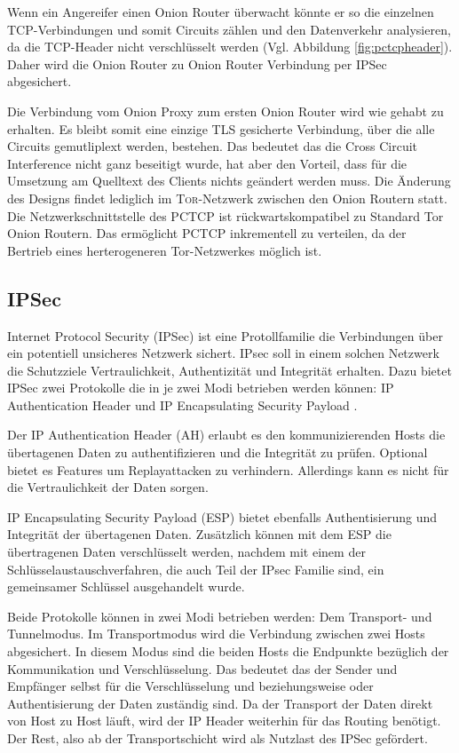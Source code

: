 \documentclass[fleqn,envcountsame,runningheads,10pt,a4paper]{llncs}
\begin{document}
Wenn ein Angereifer einen Onion Router überwacht könnte er so die einzelnen TCP-Ver\-bin\-dung\-en und somit Circuits zählen und den Datenverkehr analysieren, da die TCP-Header nicht verschlüsselt werden (Vgl. Abbildung \ref{fig:pctcpheader}). Daher wird die Onion Router zu Onion Router Verbindung per IPSec abgesichert.

Die Verbindung vom Onion Proxy zum ersten Onion Router wird wie gehabt zu erhalten. Es bleibt somit eine einzige TLS gesicherte Verbindung, über die alle Circuits gemutliplext werden, bestehen. Das bedeutet das die Cross Circuit Interference nicht ganz beseitigt wurde, hat aber den Vorteil, dass für die Umsetzung am Quelltext des Clients nichts geändert werden muss. Die Änderung des Designs findet lediglich im \textsc{Tor}-Netzwerk zwischen den Onion Routern statt. Die Netzwerkschnittstelle des PCTCP ist rückwartskompatibel zu Standard Tor Onion Routern. Das ermöglicht PCTCP inkrementell zu verteilen, da der Bertrieb eines herterogeneren Tor-Netzwerkes möglich ist.

\subsection{IPSec}

Internet Protocol Security (IPSec) ist eine Protollfamilie die Verbindungen über ein potentiell unsicheres Netzwerk sichert. IPsec soll in einem solchen Netzwerk die Schutzziele Vertraulichkeit, Authentizität und Integrität erhalten. Dazu bietet IPSec zwei Protokolle die in je zwei Modi betrieben werden können: IP Authentication Header \cite{rfc:ah} und IP Encapsulating Security Payload \cite{rfc:esp}.

Der IP Authentication Header (AH) erlaubt es den kommunizierenden Hosts die übertagenen Daten zu authentifizieren und die Integrität zu prüfen. Optional bietet es Features um Replayattacken zu verhindern. Allerdings kann es nicht für die Vertraulichkeit der Daten sorgen.

IP Encapsulating Security Payload (ESP) bietet ebenfalls Authentisierung und Integrität der übertagenen Daten. Zusätzlich können mit dem ESP die übertragenen Daten verschlüsselt werden, nachdem mit einem der Schlüsselaustauschverfahren, die auch Teil der IPsec Familie sind, ein gemeinsamer Schlüssel ausgehandelt wurde. 

Beide Protokolle können in zwei Modi betrieben werden: Dem Transport- und Tunnelmodus. Im Transportmodus wird die Verbindung zwischen zwei Hosts abgesichert. In diesem Modus sind die beiden Hosts die Endpunkte bezüglich der Kommunikation und Verschlüsselung. Das bedeutet das der Sender und Empfänger selbst für die Verschlüsselung und beziehungsweise oder Authentisierung der Daten zuständig sind. Da der Transport der Daten direkt von Host zu Host läuft, wird der IP Header weiterhin für das Routing benötigt. Der Rest, also ab der Transportschicht wird als Nutzlast des IPSec gefördert.
\end{document}
